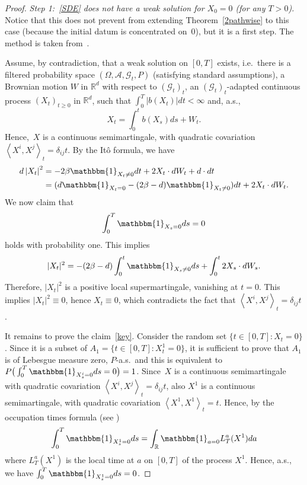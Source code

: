 \documentclass[a4paper,10pt]{article}
\newcommand\1{\mathbbm{1}}
\numberwithin{equation}{section}
\begin{document}
\begin{proof}
\emph{Step 1:~\eqref{SDE} does not have a weak solution for $X_0=0$ \textup{(}for any $T>0$\textup{)}.} Notice that this does not prevent from extending Theorem~\ref{2pathwise} to this case (because the initial datum is concentrated on~$0$), but it is a first step. The method is taken from~\cite{CHEENG05}.

Assume, by contradiction, that a weak solution on $[0,T]$ exists, i.e.~there is a filtered probability space $(\Omega,\mathcal{A},\mathcal{G}_{t},P)$ (satisfying standard assumptions), a Brownian motion $W$ in $\mathbb{R}^{d}$ with respect to $(\mathcal{G}_{t})_t$, an $(\mathcal{G}_{t})_t$-adapted continuous process $(X_{t})_{t\geq0}$ in
$\mathbb{R}^{d}$, such that $ \int_{0}^{T} \vert b(X_{t}) \vert dt<\infty$ and, a.s.,
\begin{equation*}
X_{t}=\int_{0}^{t}b(X_{s}) ds+W_{t} .
\end{equation*}
Hence,~$X$ is a continuous semimartingale, with quadratic covariation $\left\langle X^{i},X^{j}\right\rangle _{t}=\delta_{ij}t$. By the It\^{o} formula, we have
\begin{align*}
d\left\vert X_{t}\right\vert ^{2}  & =-2\beta \1_{X_{t}\neq0}dt+2X_{t}\cdot
dW_{t}+d\cdot dt\\
& =(d \1_{X_{t}=0}-(2\beta-d) \1_{X_{t}\neq0})dt+2X_{t}\cdot dW_{t}.
\end{align*}
We now claim that
\begin{equation}
\int_{0}^{T} \1_{X_{s}=0}ds=0\label{key} 
\end{equation}
holds with probability one. This implies
\begin{equation*}
\vert X_{t} \vert ^{2}=-(2\beta-d)\int^t_0 \1_{X_{s}\neq0}ds+\int_{0}^{t}2X_{s}\cdot dW_{s}.
\end{equation*}
Therefore, $\vert X_{t} \vert^{2}$ is a positive local supermartingale, vanishing at $t=0$. This implies $\vert X_{t} \vert^{2}\equiv0$, hence $X_{t}\equiv0$, which contradicts the fact that $\left\langle X^{i},X^{j}\right\rangle _{t}=\delta_{ij}t$. 

It remains to prove the claim~\eqref{key}. Consider the random set $\{ t\in [0,T] \colon X_{t}=0\}$. Since it is a subset of $A_{1}=\{ t\in [0,T] \colon X_{t}^{1}=0 \}$, it is sufficient to prove that $A_{1}$ is of Lebesgue measure zero, $P$-a.s.~and this is equivalent to $P\big(\int_{0}^{T}  \1_{X_{s}^{i}=0}ds=0 \big)=1$. Since~$X$ is a continuous semimartingale with quadratic covariation $\left\langle X^{i},X^{j}\right\rangle _{t}=\delta_{ij}t$, also $X^{1}$ is a continuous semimartingale, with quadratic covariation $\left\langle X^{1},X^{1} \right\rangle _{t}=t$. Hence, by the occupation times formula (see
\cite[Chapter~VI, Corollary~1.6]{REVYOR94})
\begin{equation*}
\int_{0}^{T} \1_{X_{s}^{1}=0}ds=\int_{\mathbb{R}} \1_{a=0}L_{T}^{a}(X^{1})  da
\end{equation*}
where $L_{T}^{a}( X^{1})$ is the local time at $a$ on $[
0,T]  $ of the process $X^{1}$. Hence, a.s., we have $\int_{0}^{T} \1_{X_{s}^{1}=0}ds=0$. 


\end{proof}
\end{document}
